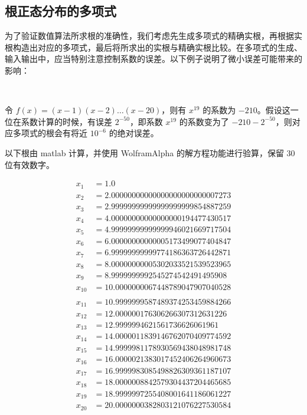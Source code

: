 \subsection{根正态分布的多项式}

为了验证数值算法所求根的准确性，我们考虑先生成多项式的精确实根，再根据实根构造出对应的多项式，最后将所求出的实根与精确实根比较。在多项式的生成、输入输出中，应当特别注意控制系数的误差。以下例子说明了微小误差可能带来的影响：

\begin{example}~

	令 $f(x) = (x-1)(x-2)\dots(x-20)$，则有 $x^{19}$ 的系数为 $-210$。假设这一位在系数计算的时候，有误差 $2^{-50}$，即系数 $x^{19}$ 的系数变为了 $-210 - 2^{-50}$，则对应多项式的根会有将近 $10^{-6}$ 的绝对误差。

	以下根由 matlab 计算，并使用 WolframAlpha 的解方程功能进行验算，保留 $30$ 位有效数字。

	$$
	\begin{aligned}
		x_1&=1.0 \\
		x_2&=2.00000000000000000000000007273 \\
		x_3&=2.99999999999999999999854887259 \\
		x_4&=4.00000000000000000194477430517 \\
		x_5&=4.99999999999999946021669717504 \\
		x_6&=6.00000000000005173499077404847 \\
		x_7&=6.99999999999774186363726442871 \\
		x_8&=8.00000000005302033521539523965 \\
		x_9&=8.9999999992545274542491495908 \\
		x_{10}&=10.0000000067448789047907040528 \\
	\end{aligned}
	$$
	$$
	\begin{aligned}
		x_{11}&=10.9999999587489374253459884266 \\
		x_{12}&=12.000000176306266307312631226 \\
		x_{13}&=12.9999994621561736626061961 \\
		x_{14}&=14.0000011839146762070409774592 \\
		x_{15}&=14.9999981178930569438048981748 \\
		x_{16}&=16.0000021383017452406264960673 \\
		x_{17}&=16.9999983085498826309361187107 \\
		x_{18}&=18.0000008842579304437204465685 \\
		x_{19}&=18.9999997255408001641186061227 \\
		x_{20}&=20.0000000382803121076227530584 \\
	\end{aligned}
	$$

\end{example}

